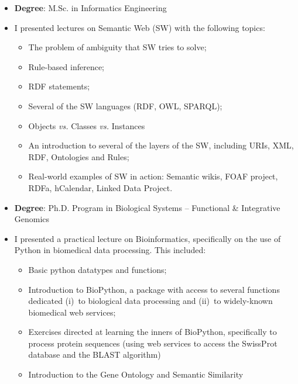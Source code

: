 \begin{itemize}
    \item \textbf{Degree}: M.Sc. in Informatics Engineering
    \item I presented lectures on Semantic Web (SW) with the following topics:
    \begin{itemize}
        \item The problem of ambiguity that SW tries to solve;
        \item Rule-based inference;
        \item RDF statements;
        \item Several of the SW languages (RDF, OWL, SPARQL);
        \item Objects \emph{vs.} Classes \emph{vs.} Instances
        \item An introduction to several of the layers of the SW, including URIs, XML, RDF, Ontologies and Rules;
        \item Real-world examples of SW in action: Semantic wikis, FOAF project, RDFa, hCalendar, Linked Data Project.
    \end{itemize}
\end{itemize}

\begin{itemize}
    \item \textbf{Degree}: Ph.D. Program in Biological Systems -- Functional \& Integrative Genomics
    \item I presented a practical lecture on Bioinformatics, specifically on the use of Python in biomedical data processing. This included:
    \begin{itemize}
        \item Basic python datatypes and functions;
        \item Introduction to BioPython, a package with access to several functions dedicated (i)~to biological data processing and (ii)~to widely-known biomedical web services;
        \item Exercises directed at learning the inners of BioPython, specifically to process protein sequences (using web services to access the SwissProt database and the BLAST algorithm)
        \item Introduction to the Gene Ontology and Semantic Similarity
    \end{itemize}
\end{itemize}

